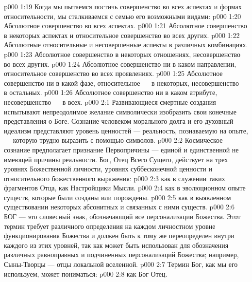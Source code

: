 \vs p000 1:19 \pc Когда мы пытаемся постичь совершенство во всех аспектах и формах относительности, мы сталкиваемся с семью его возможными видами:
\vs p000 1:20 \bibnobreakspace Абсолютное совершенство во всех аспектах.
\vs p000 1:21 \bibnobreakspace Абсолютное совершенство в некоторых аспектах и относительное совершенство во всех других.
\vs p000 1:22 \bibnobreakspace Абсолютные относительные и несовершенные аспекты в различных комбинациях.
\vs p000 1:23 \bibnobreakspace Абсолютное совершенство в некоторых отношениях, несовершенство во всех других.
\vs p000 1:24 \bibnobreakspace Абсолютное совершенство ни в каком направлении, относительное совершенство во всех проявлениях.
\vs p000 1:25 \bibnobreakspace Абсолютное совершенство ни в какой фазе, относительное --- в некоторых, несовершенство --- в остальных.
\vs p000 1:26 \bibnobreakspace Абсолютное совершенство ни в каком атрибуте, несовершенство --- в всех.
\vs p000 2:1 Развивающиеся смертные создания испытывают непреодолимое желание символически изобразить свои конечные представления о Боге. Сознание человеком морального долга и его духовный идеализм представляют уровень ценностей --- реальность, познаваемую на опыте, --- которую трудно выразить с помощью символов.
\vs p000 2:2 Космическое сознание предполагает признание Первопричины --- единой и единственной не имеющей причины реальности. Бог, Отец Всего Сущего, действует на трех уровнях Божественной личности, уровнях суббесконечной ценности и относительного божественного выражения:
\vs p000 2:3 \bibnobreakspace {} как в служении таких фрагментов Отца, как Настройщики Мысли.
\vs p000 2:4 \bibnobreakspace {} как в эволюционном опыте существ, которые были созданы или порождены.
\vs p000 2:5 \bibnobreakspace {} как в выявленном существовании некоторых абсонитных и связанных с ними существ.
\vs p000 2:6 БОГ --- это словесный знак, обозначающий все персонализации Божества. Этот термин требует различного определения на каждом личностном уровне функционирования Божества и должен быть к тому же переопределен внутри каждого из этих уровней, так как может быть использован для обозначения различных равноправных и подчиненных персонализаций Божества; например, Сыны\hyp{}Творцы --- отцы локальной вселенной.
\vs p000 2:7 \pc Термин Бог, как мы его используем, может пониматься:
\vs p000 2:8  как Бог Отец.
